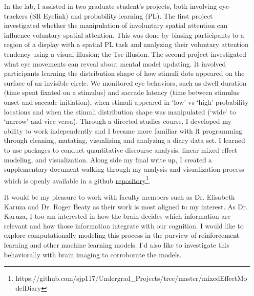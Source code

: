 \documentclass[12pt]{article}
\begin{document}
	In the lab, I assisted in two graduate student's projects, both involving eye-trackers (SR Eyelink) and probability learning (PL). The first project investigated whether the manipulation of involuntary spatial attention can influence voluntary spatial attention. This was done by biasing participants to a region of a display with a spatial PL task and analyzing their voluntary attention tendency using a visual illusion; the Tse illusion. The second project investigated what eye movements can reveal about mental model updating. It involved participants learning the distribution shape of how stimuli dots appeared on the surface of an invisible circle. We monitored eye behaviors, such as dwell duration (time spent fixated on a stimulus) and saccade latency (time between stimulus onset and saccade initiation), when stimuli appeared in `low' vs `high' probability locations and when the stimuli distribution shape was manipulated (`wide' to `narrow' and vice versa). Through a directed studies course, I developed my ability to work independently and I became more familiar with R programming through cleaning, mutating, visualizing and analyzing a diary data set. I learned to use packages to conduct quantitative discourse analysis, linear mixed effect modeling, and visualization. Along side my final write up, I created a supplementary document walking through my analysis and visualization process which is openly available in a github \href{https://github.com/sjp117/Undergrad_Projects/tree/master/mixedEffectModelDiary}{repository}\footnote{https://github.com/sjp117/Undergrad\_Projects/tree/master/mixedEffectModelDiary}.
	
	It would be my pleasure to work with faculty members such as Dr. Elisabeth Karuza and Dr. Roger Beaty as their work is most aligned to my interest. As Dr. Karuza, I too am interested in how the brain decides which information are relevant and how those information integrate with our cognition. I would like to explore computationally modeling this process in the purview of reinforcement learning and other machine learning models. I'd also like to investigate this behaviorally with brain imaging to corroborate the models.
	
\end{document}
